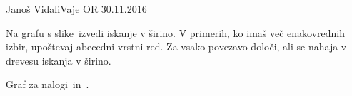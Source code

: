 \begin{naloga}{Janoš Vidali}{Vaje OR 30.11.2016}
\begin{vprasanje}
Na grafu s slike~\fig izvedi iskanje v širino.
V primerih, ko imaš več ena\-ko\-vred\-nih izbir,
upoštevaj abecedni vrstni red.
Za vsako povezavo določi, ali se nahaja v drevesu iskanja v širino.

\begin{slika}
\pgfslika
\caption{Graf za nalogi~\nal in~\nal[dfs].}
\end{slika}
\end{vprasanje}
\begin{odgovor}
\end{odgovor}
\end{naloga}
